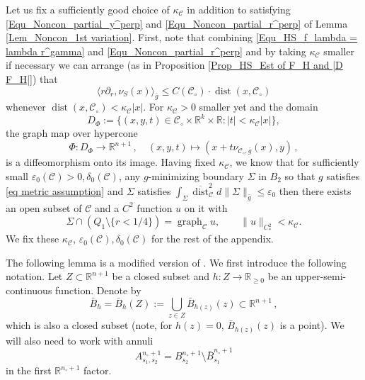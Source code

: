 \documentclass[11pt, letterpaper, reqno]{amsart}
\numberwithin{equation}{section}
\theoremstyle{remark}
\newcommand{\RR}{\mathbb{R}}
\newcommand{\cC}{\mathcal{C}}
\newcommand{\graph}{\operatorname{graph}}
\newcommand{\dist}{\operatorname{dist}}
\newcommand{\Sdist}{\overline{\dist}}
\newcommand{\eps}{\varepsilon}
\begin{document}
Let us fix a sufficiently good choice of $\kappa_\cC$ in addition to satisfying \eqref{Equ_Noncon_partial_y^perp} and \eqref{Equ_Noncon_partial_r^perp} of Lemma \ref{Lem_Noncon_1st variation}. First, note that combining \eqref{Equ_HS_f_lambda = lambda r^gamma} and \eqref{Equ_Noncon_partial_r^perp} and by taking $\kappa_\cC$ smaller if necessary we can arrange (as in Proposition \ref{Prop_HS_Est of F_H and |D F_H|}) that
\begin{equation}
\langle r\partial_r, \nu_{{S}}(x) \rangle_{\bar g} \leq C(\cC_\circ) \cdot \dist(x, \cC_\circ)
\label{eq radial XH comparable dist}
\end{equation}
whenever $\dist(x, \cC_\circ) < \kappa_\cC |x|$. For $\kappa_\cC > 0$ smaller yet and the domain
\[
D_\Phi := \{ (x, y, t) \in \cC_\circ \times \RR^k \times \RR : |t| < \kappa_\cC |x| \},
\]
the graph map over hypercone 
\begin{equation} \label{eq:app.noncon.tub.nghd}
	\Phi: D_\Phi \to \RR^{n+1}\,,\quad (x, y, t)\mapsto ( x+t\nu_{\cC_\circ, \bar g}(x), y)\,,
\end{equation}
is a diffeomorphism onto its image. Having fixed $\kappa_\cC$, we know that for sufficiently small $\eps_0(\cC) > 0,\delta_0(\cC)$, any $g$-minimizing boundary $\Sigma$ in $B_2$ so that $g$ satisfies \eqref{eq metric assumption} and $\Sigma$ satisfies $\int_{\Sigma}\Sdist_\cC^2 d\|\Sigma\|_{\bar g} \leq \eps_0$ then there exists an open subset of $\cC$ and a $C^2$ function $u$ on it with
\begin{equation} \label{eq:app.noncon.eps0}
	\Sigma \cap (Q_1 \setminus \{ r < 1/4 \}) = \graph_\cC u, \qquad \| u \|_{C^2_*} < \kappa_\cC.
\end{equation}
We fix these $\kappa_\cC$, $\eps_0(\cC),\delta_0(\cC)$ for the rest of the appendix.



   The following lemma is a modified version of \cite[Lemma 1.4]{Simon:uniqueness.some}. We first introduce the following notation.  Let $Z\subset \RR^{n+1}$ be a closed subset and $h:Z\to \RR_{\geq 0}$ be an upper-semi-continuous function.  Denote by \begin{equation}\label{eq:def.base.set}
       \bar{B}_h = \bar B_h(Z) := \bigcup_{z\in Z} \bar{B}_{h(z)}(z) \subset \RR^{n+1}\,,
   \end{equation}
   which is also a closed subset (note, for $h(z) = 0$, $\bar B_{h(z)}(z)$ is a point). We will also need to work with annuli
   \[ A^{n_\circ+1}_{s_1, s_2} = B^{n_\circ+1}_{s_2} \setminus \bar B^{n_\circ+1}_{s_1} \]
   in the first $\RR^{n_\circ+1}$ factor. 
\end{document}
